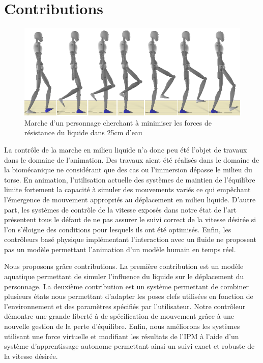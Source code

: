 \documentclass[runningheads,a4paper]{llncs}
\begin{document}
\section{Contributions}


\begin{figure}[h]
\centering
\includegraphics[scale=0.6]{strips/min_drag_25cm.png}
\caption{Marche d'un personnage cherchant à minimiser les forces de résistance du liquide dans 25cm d'eau}
\label{fig:min_drag_25}
\end{figure}


La contrôle de la marche en milieu liquide n'a donc peu été l'objet de travaux dans le domaine de l'animation.  Des travaux aient été réalisés dans le domaine de la biomécanique ne considérant que des cas ou l'immersion dépasse le milieu du torse. En animation, l'utilisation actuelle des systèmes de maintien de l'équilibre limite fortement la capacité à simuler des mouvements variés ce qui empêchant l'émergence de mouvement appropriés au déplacement en milieu liquide. D'autre part, les systèmes de contrôle de la vitesse exposés dans notre état de l'art présentent tous  le défaut de ne pas assurer le suivi correct de la vitesse désirée si l'on s'éloigne des conditions pour lesquels ils ont été optimisés. Enfin, les contrôleurs basé physique implémentant l'interaction avec un fluide ne proposent pas un modèle permettant l'animation d'un modèle humain en temps réel.

Nous proposons grâce contributions. La première contribution est un modèle aquatique permettant de simuler l'influence du liquide sur le déplacement du personnage. La deuxième contribution est un système permettant de combiner plusieurs états nous permettant d'adapter les poses clefs utilisées en fonction de l'environnement et des paramètres spécifiés par l'utilisateur. Notre contrôleur démontre une grande liberté à de spécification de mouvement grâce à une nouvelle gestion de la perte d'équilibre. Enfin, nous améliorons les systèmes utilisant une force virtuelle et modifiant les résultats de l'IPM à l'aide d'un système d'apprentissage autonome permettant ainsi un suivi exact et robuste de la vitesse désirée. 
\end{document}

